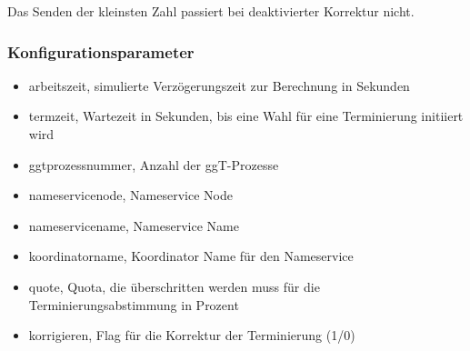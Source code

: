 \documentclass{article}
\begin{document}
Das Senden der kleinsten Zahl passiert bei deaktivierter Korrektur nicht.

\subsubsection{Konfigurationsparameter}
\begin{itemize}
    \item arbeitszeit, simulierte Verzögerungszeit zur Berechnung in Sekunden
    \item termzeit, Wartezeit in Sekunden, bis eine Wahl für eine Terminierung initiiert wird
    \item ggtprozessnummer, Anzahl der ggT-Prozesse
    \item nameservicenode, Nameservice Node
    \item nameservicename, Nameservice Name
    \item koordinatorname, Koordinator Name für den Nameservice
    \item quote, Quota, die überschritten werden muss für die Terminierungsabstimmung in Prozent
    \item korrigieren, Flag für die Korrektur der Terminierung (1/0)
\end{itemize}
\end{document}
